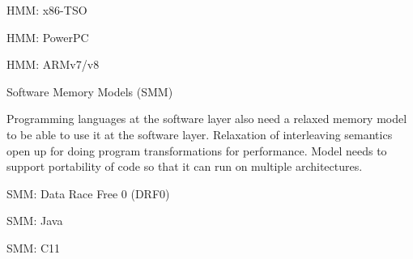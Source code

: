 \documentclass[xcolor={dvipsnames}]{beamer}
\begin{document}
    \begin{frame}{HMM: x86-TSO}
        

    \end{frame}


    \begin{frame}{HMM: PowerPC}


    \end{frame}



    \begin{frame}{HMM: ARMv7/v8}

    
    \end{frame}

    \begin{frame}{Software Memory Models (SMM)}

        Programming languages at the software layer also need a relaxed memory model to be able to use it at the software layer.
        Relaxation of interleaving semantics open up for doing program transformations for performance.
        Model needs to support portability of code so that it can run on multiple architectures.
    \end{frame}

    \begin{frame}{SMM: Data Race Free 0 (DRF0)}
        
    \end{frame}

    \begin{frame}{SMM: Java}
        
    \end{frame}

    \begin{frame}{SMM: C11}
        
    \end{frame}
\end{document}
